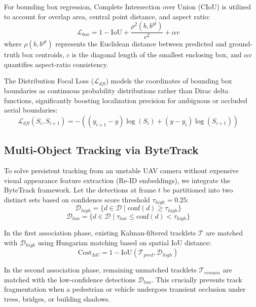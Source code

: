 \documentclass[conference]{IEEEtran}
\begin{document}
For bounding box regression, Complete Intersection over Union (CIoU) is utilized to account for overlap area, central point distance, and aspect ratio:
\begin{equation}
\mathcal{L}_{box} = 1 - \text{IoU} + \frac{\rho^2(b, b^{gt})}{c^2} + \alpha v
\label{eq:ciou}
\end{equation}
where $\rho(b, b^{gt})$ represents the Euclidean distance between predicted and ground-truth box centroids, $c$ is the diagonal length of the smallest enclosing box, and $\alpha v$ quantifies aspect-ratio consistency.

The Distribution Focal Loss ($\mathcal{L}_{dfl}$) models the coordinates of bounding box boundaries as continuous probability distributions rather than Dirac delta functions, significantly boosting localization precision for ambiguous or occluded aerial boundaries:
\begin{equation}
\mathcal{L}_{dfl}(S_i, S_{i+1}) = - \left( (y_{i+1} - y)\log(S_i) + (y - y_i)\log(S_{i+1}) \right)
\label{eq:dfl}
\end{equation}

\subsection{Multi-Object Tracking via ByteTrack}
To solve persistent tracking from an unstable UAV camera without expensive visual appearance feature extraction (Re-ID embeddings), we integrate the ByteTrack framework. Let the detections at frame $t$ be partitioned into two distinct sets based on confidence score threshold $\tau_{high} = 0.25$:
\begin{equation}
\mathcal{D}_{high} = \{d \in \mathcal{D} \mid \text{conf}(d) \ge \tau_{high}\}
\end{equation}
\begin{equation}
\mathcal{D}_{low} = \{d \in \mathcal{D} \mid \tau_{low} \le \text{conf}(d) < \tau_{high}\}
\end{equation}

In the first association phase, existing Kalman-filtered tracklets $\mathcal{T}$ are matched with $\mathcal{D}_{high}$ using Hungarian matching based on spatial IoU distance:
\begin{equation}
\text{Cost}_{IoU} = 1 - \text{IoU}(\mathcal{T}_{pred}, \mathcal{D}_{high})
\end{equation}

In the second association phase, remaining unmatched tracklets $\mathcal{T}_{remain}$ are matched with the low-confidence detections $\mathcal{D}_{low}$. This crucially prevents track fragmentation when a pedestrian or vehicle undergoes transient occlusion under trees, bridges, or building shadows.
\end{document}
